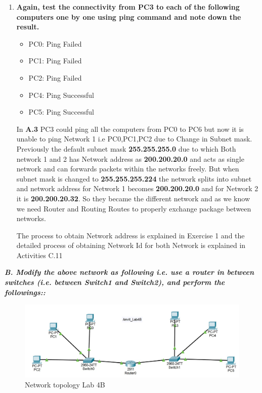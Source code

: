 \documentclass[a4paper,11pt]{article}
\begin{document}
\begin{enumerate}
      \item \textbf{Again, test the connectivity from PC3 to each of the following computers one by one using ping command and note down the result.}
            \begin{itemize}
                  \item PC0: Ping Failed
                  \item PC1: Ping Failed
                  \item PC2: Ping Failed\\
                  \item PC4: Ping Successful
                  \item PC5: Ping Successful\\
            \end{itemize}
            In \textbf{A.3} PC3 could ping all the computers from PC0 to PC6 but now it is unable to ping Network 1 i.e PC0,PC1,PC2  due to Change in Subnet mask. Previously the default subnet mask \textbf{255.255.255.0} due to which Both network 1 and 2 has Network address as \textbf{200.200.20.0} and acts as single network and can forwards packets within the networks freely. But when subnet mask is changed to \textbf{255.255.255.224} the network splits into subnet and network address for Network 1 becomes \textbf{200.200.20.0} and for Network 2 it is \textbf{200.200.20.32}.  So they became the different network and as we know we need Router and Routing Routes to properly exchange package between networks.

            The process to obtain Network address is explained in Exercise 1 and the detailed process of obtaining Network Id for both Network is explained in Activities C.11

\end{enumerate}


\pagebreak

{\bfseries \textit{B. Modify the above network as following i.e. use a router in between switches (i.e. between Switch1 and Switch2), and perform the followings::}}

\begin{figure}[H]
      \centering
      \includegraphics[scale=0.60,cframe=blue 0.5pt 3pt]{Lab4B.jpg}
      \caption{Network topology Lab 4B}
\end{figure}
\end{document}
